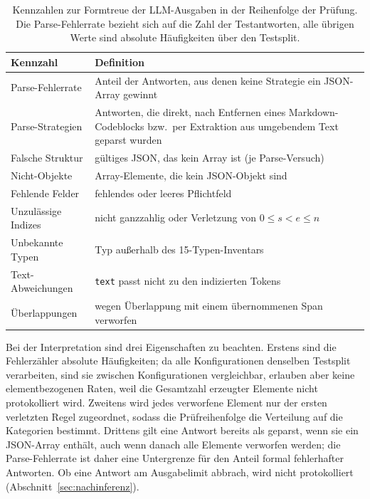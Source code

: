 \begin{table}[ht]
  \centering
  \small
  \caption[Kennzahlen zur Formtreue der LLM-Ausgaben]{Kennzahlen zur Formtreue der LLM-Ausgaben in der Reihenfolge
  der Prüfung.
  Die Parse-Fehlerrate bezieht sich auf die Zahl der Testantworten, alle
  übrigen Werte sind absolute Häufigkeiten über den Testsplit.}
  \label{tab:formtreue}
  \begin{tabularx}{\linewidth}{@{}>{\raggedright\arraybackslash}p{3.3cm}%
      >{\raggedright\arraybackslash}X@{}}
    \toprule
    \textbf{Kennzahl} & \textbf{Definition} \\
    \midrule
    Parse-Fehlerrate & Anteil der Antworten, aus denen keine Strategie ein
      JSON-Array gewinnt \\
    \addlinespace
    Parse-Strategien & Antworten, die direkt, nach Entfernen eines
      Markdown-Codeblocks bzw.\ per Extraktion aus umgebendem Text geparst
      wurden \\
    \addlinespace
    Falsche Struktur & gültiges JSON, das kein Array ist (je
      Parse-Versuch) \\
    \addlinespace
    Nicht-Objekte & Array-Elemente, die kein JSON-Objekt sind \\
    \addlinespace
    Fehlende Felder & fehlendes oder leeres Pflichtfeld \\
    \addlinespace
    Unzulässige Indizes & nicht ganzzahlig oder Verletzung von
      $0 \leq s < e \leq n$ \\
    \addlinespace
    Unbekannte Typen & Typ außerhalb des 15-Typen-Inventars \\
    \addlinespace
    Text-Abweichungen & \texttt{text} passt nicht zu den indizierten
      Tokens \\
    \addlinespace
    Überlappungen & wegen Überlappung mit einem übernommenen Span
      verworfen \\
    \bottomrule
  \end{tabularx}
\end{table}

Bei der Interpretation sind drei Eigenschaften zu beachten.
Erstens sind die Fehlerzähler absolute Häufigkeiten; da alle
Konfigurationen denselben Testsplit verarbeiten, sind sie zwischen
Konfigurationen vergleichbar, erlauben aber keine elementbezogenen Raten,
weil die Gesamtzahl erzeugter Elemente nicht protokolliert wird.
Zweitens wird jedes verworfene Element nur der ersten verletzten Regel
zugeordnet, sodass die Prüfreihenfolge die Verteilung auf die Kategorien
bestimmt.
Drittens gilt eine Antwort bereits als geparst, wenn sie ein JSON-Array
enthält, auch wenn danach alle Elemente verworfen werden; die
Parse-Fehlerrate ist daher eine Untergrenze für den Anteil formal
fehlerhafter Antworten.
Ob eine Antwort am Ausgabelimit abbrach, wird nicht protokolliert
(Abschnitt~\ref{sec:nachinferenz}).

